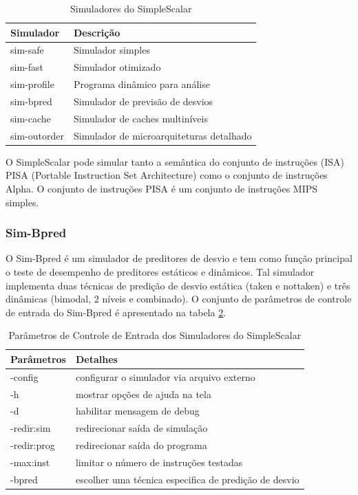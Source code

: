 \documentclass[12pt]{article}
\begin{document}
\begin{table}[ht]
\centering
\caption{Simuladores do SimpleScalar}
\label{tab:tblsimulador}
\smallskip
\begin{tabular}{l|l}
\hline
\textbf{Simulador} & \textbf{Descrição} \\[0.5ex]
\hline
sim-safe & Simulador simples\\[0.5ex]
\hline
sim-fast & Simulador otimizado \\[0.5ex]
\hline
sim-profile & Programa dinâmico para análise \\[0.5ex]
\hline
sim-bpred & Simulador de previsão de desvios \\[0.5ex]
\hline
sim-cache & Simulador de caches multiníveis \\[0.5ex]
\hline
sim-outorder & Simulador de microarquiteturas detalhado \\[0.5ex]
\hline
\end{tabular}
\end{table}

O SimpleScalar pode simular tanto a semântica do conjunto de instruções (ISA) PISA (Portable Instruction Set Architecture) como o conjunto de instruções Alpha. O conjunto de instruções PISA é um conjunto de instruções MIPS simples.

\subsubsection{Sim-Bpred}

O Sim-Bpred é um simulador de preditores de desvio e tem como função principal o teste de desempenho de preditores estáticos e dinâmicos. Tal simulador
implementa duas técnicas de predição de desvio estática (taken e nottaken) e três dinâmicas (bimodal, 2 níveis e combinado). O conjunto de parâmetros de
controle de entrada do Sim-Bpred é apresentado na tabela \ref{tab:tblsimuladorp}.


\begin{table}[ht]
\centering
\caption{Parâmetros de Controle de Entrada dos Simuladores do SimpleScalar}
\label{tab:tblsimuladorp}
\smallskip
\begin{tabular}{l|l}
\hline
\textbf{Parâmetros} & \textbf{Detalhes} \\[0.5ex]
\hline
-config & configurar o simulador via arquivo externo \\[0.5ex]
\hline
-h & mostrar opções de ajuda na tela \\[0.5ex]
\hline
-d & habilitar mensagem de debug \\[0.5ex]
\hline
-redir:sim & redirecionar saída de simulação \\[0.5ex]
\hline
-redir:prog & redirecionar saída do programa \\[0.5ex]
\hline
-max:inst & limitar o número de instruções testadas \\[0.5ex]
\hline
-bpred & escolher uma técnica especifica de predição de desvio \\[0.5ex]
\hline
\end{tabular}
\end{table}
\end{document}
